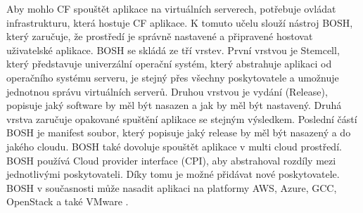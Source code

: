     Aby mohlo CF spouštět aplikace na virtuálních serverech, potřebuje ovládat infrastrukturu, která hostuje CF aplikace. K tomuto učelu slouží nástroj BOSH, který \linebreak zaručuje, že prostředí je správně nastavené a připravené hostovat uživatelské aplikace. BOSH se skládá ze tří vrstev. První vrstvou je Stemcell, který představuje univerzální operační systém, který abstrahuje aplikaci od operačního systému serveru, je stejný přes všechny poskytovatele a umožnuje jednotnou správu virtuálních serverů. Druhou vrstvou je vydání (Release), popisuje jaký software by měl být nasazen a jak by měl být nastavený. Druhá vrstva zaručuje opakované spuštění aplikace se stejným výsledkem. Poslední částí BOSH je 
    manifest soubor, který popisuje jaký release by měl být nasazený a do jakého cloudu. BOSH také dovoluje spouštět aplikace v multi cloud prostředí. BOSH používá Cloud provider interface (CPI), aby abstrahoval rozdíly mezi jednotlivými poskytovateli. Díky tomu je možné přidávat nové poskytovatele. BOSH v současnosti může nasadit aplikaci na platformy AWS, Azure, GCC, OpenStack a také VMware \cite{bosh}.

